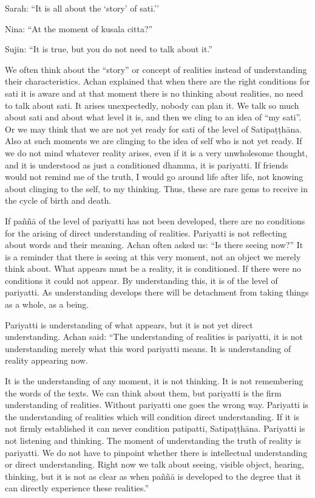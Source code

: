 Sarah: ``It is all about the `story’ of sati.'' 

Nina: ``At the moment of kusala citta?'' 

Sujin: ``It is true, but you do not need to talk about it.'' 

We often think about the ``story'' or concept of realities instead of understanding their 
characteristics.  Achan explained that when there are the right conditions for sati it is 
aware and at that moment there is no thinking about realities, no need to talk about 
sati. It arises unexpectedly, nobody can plan it. We talk so much about sati and about 
what level it is, and then we cling to an idea of ``my sati''. Or we may think that we 
are not yet ready for sati of the level of Satipaṭṭhāna. Also at such moments we are 
clinging to the idea of self who is not yet ready. If we do not mind whatever reality 
arises, even if it is a very unwholesome thought, and it is understood as just a conditioned dhamma, it is pariyatti. If friends would not remind me of the truth, I would go 
around life after life, not knowing about clinging to the self, to my thinking. Thus, 
these are rare gems to receive in the cycle of birth and death. 

If paññā of the level of pariyatti has not been developed, there are no conditions for 
the arising of direct understanding of realities. Pariyatti is not reflecting about words 
and their meaning.  Achan often asked us: ``Is there seeing now?'' It is a reminder that 
there is seeing at this very moment, not an object we merely think about. What appears must be a reality, it is conditioned. If there were no conditions it could not appear. By understanding this, it is of the level of pariyatti. As understanding develops 
there will be detachment from taking things as a whole, as a being. 

Pariyatti is understanding of what appears, but it is not yet direct understanding. Achan said: ``The understanding of realities is pariyatti, it is not understanding 
merely what this word pariyatti means. It is understanding of reality appearing now. 

It is the understanding of any moment, it is not thinking. It is not remembering the 
words of the texts. We can think about them, but pariyatti is the firm understanding 
of realities. Without pariyatti one goes the wrong way. Pariyatti is the understanding 
of realities which will condition direct understanding. If it is not firmly established it 
can never condition patipatti, Satipaṭṭhāna. Pariyatti is not listening and thinking. The 
moment of understanding the truth of reality is pariyatti. We do not have to pinpoint 
whether there is intellectual understanding or direct understanding. Right now we talk 
about seeing, visible object, hearing, thinking, but it is not as clear as when paññā is 
developed to the degree that it can directly experience these realities.'' 



